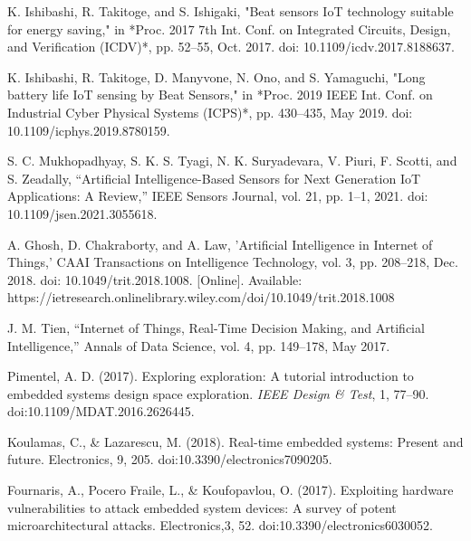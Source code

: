 \documentclass[conference]{IEEEtran}
\begin{document}
\begin{thebibliography}{00}
K. Ishibashi, R. Takitoge, and S. Ishigaki, 
"Beat sensors IoT technology suitable for energy saving," 
in *Proc. 2017 7th Int. Conf. on Integrated Circuits, Design, and Verification (ICDV)*, pp. 52--55, Oct. 2017. doi: 10.1109/icdv.2017.8188637.

K. Ishibashi, R. Takitoge, D. Manyvone, N. Ono, and S. Yamaguchi, 
"Long battery life IoT sensing by Beat Sensors," 
in *Proc. 2019 IEEE Int. Conf. on Industrial Cyber Physical Systems (ICPS)*, pp. 430--435, May 2019. doi: 10.1109/icphys.2019.8780159.

 S. C. Mukhopadhyay, S. K. S. Tyagi, N. K. Suryadevara, V. Piuri, F. Scotti, and S. Zeadally, 
``Artificial Intelligence-Based Sensors for Next Generation IoT Applications: A Review,'' 
IEEE Sensors Journal, vol. 21, pp. 1--1, 2021. doi: 10.1109/jsen.2021.3055618.

 A. Ghosh, D. Chakraborty, and A. Law, 
'Artificial Intelligence in Internet of Things,' 
CAAI Transactions on Intelligence Technology, vol. 3, pp. 208--218, Dec. 2018. doi: 10.1049/trit.2018.1008. [Online]. Available: https://ietresearch.onlinelibrary.wiley.com/doi/10.1049/trit.2018.1008

 J. M. Tien, 
``Internet of Things, Real-Time Decision Making, and Artificial Intelligence,'' 
Annals of Data Science, vol. 4, pp. 149--178, May 2017.

Pimentel, A. D. (2017). Exploring exploration: A tutorial introduction to embedded systems design space exploration. \textit{IEEE Design \& Test}, 1, 77--90. doi:10.1109/MDAT.2016.2626445.

Koulamas, C., \& Lazarescu, M. (2018). Real-time embedded systems: Present and future. Electronics, 9, 205. doi:10.3390/electronics7090205.

Fournaris, A., Pocero Fraile, L., \& Koufopavlou, O. (2017). Exploiting hardware vulnerabilities to attack embedded system devices: A survey of potent microarchitectural attacks. Electronics,3, 52. doi:10.3390/electronics6030052.

\end{thebibliography}

\end{document}
